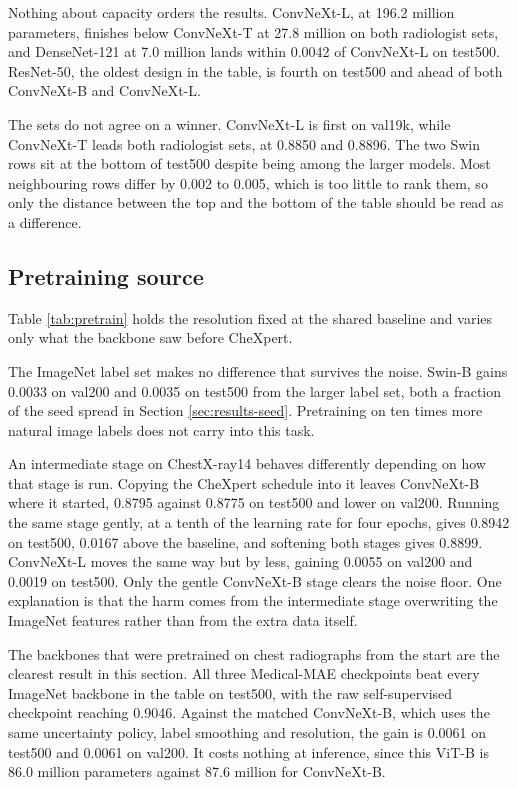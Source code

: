 \documentclass{article}
\begin{document}
Nothing about capacity orders the results. ConvNeXt-L, at 196.2 million parameters,
finishes below ConvNeXt-T at 27.8 million on both radiologist sets, and DenseNet-121 at
7.0 million lands within 0.0042 of ConvNeXt-L on test500. ResNet-50, the oldest design
in the table, is fourth on test500 and ahead of both ConvNeXt-B and ConvNeXt-L.

The sets do not agree on a winner. ConvNeXt-L is first on val19k, while ConvNeXt-T leads
both radiologist sets, at 0.8850 and 0.8896. The two Swin rows sit at the bottom of
test500 despite being among the larger models. Most neighbouring rows differ by 0.002 to
0.005, which is too little to rank them, so only the distance between the top and the
bottom of the table should be read as a difference.



\subsection{Pretraining source}
\label{sec:results-pretrain}

Table \ref{tab:pretrain} holds the resolution fixed at the shared baseline and varies
only what the backbone saw before CheXpert.

The ImageNet label set makes no difference that survives the noise. Swin-B gains 0.0033
on val200 and 0.0035 on test500 from the larger label set, both a fraction of the seed
spread in Section \ref{sec:results-seed}. Pretraining on ten times more natural image
labels does not carry into this task.

An intermediate stage on ChestX-ray14 behaves differently depending on how that stage
is run. Copying the CheXpert schedule into it leaves ConvNeXt-B where it started, 0.8795
against 0.8775 on test500 and lower on val200. Running the same stage gently, at a tenth
of the learning rate for four epochs, gives 0.8942 on test500, 0.0167 above the baseline,
and softening both stages gives 0.8899. ConvNeXt-L moves the same way but by less,
gaining 0.0055 on val200 and 0.0019 on test500. Only the gentle ConvNeXt-B stage clears
the noise floor. One explanation is that the harm comes from the intermediate stage
overwriting the ImageNet features rather than from the extra data itself.

The backbones that were pretrained on chest radiographs from the start are the clearest
result in this section. All three Medical-MAE checkpoints beat every ImageNet backbone
in the table on test500, with the raw self-supervised checkpoint reaching 0.9046.
Against the matched ConvNeXt-B, which uses the same uncertainty policy, label smoothing
and resolution, the gain is 0.0061 on test500 and 0.0061 on val200. It costs nothing at
inference, since this ViT-B is 86.0 million parameters against 87.6 million for
ConvNeXt-B.
\end{document}
